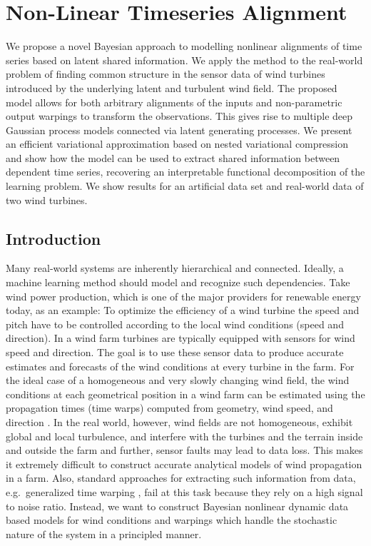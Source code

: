 \chapter{Non-Linear Timeseries Alignment}
\label{toc:alignment}
We propose a novel Bayesian approach to modelling nonlinear alignments of time series based on latent shared information.
We apply the method to the real-world problem of finding common structure in the sensor data of wind turbines introduced by the underlying latent and turbulent wind field.
The proposed model allows for both arbitrary alignments of the inputs and non-parametric output warpings to transform the observations.
This gives rise to multiple deep Gaussian process models connected via latent generating processes.
We present an efficient variational approximation based on nested variational compression and show how the model can be used to extract shared information between dependent time series, recovering an interpretable functional decomposition of the learning problem.
We show results for an artificial data set and real-world data of two wind turbines.


\section{Introduction}
Many real-world systems are inherently hierarchical and connected.
Ideally, a machine learning method should model and recognize such dependencies.
Take wind power production, which is one of the major providers for renewable energy today, as an example:
To optimize the efficiency of a wind turbine the speed and pitch have to be controlled according to the local wind conditions (speed and direction).
In a wind farm turbines are typically equipped with sensors for wind speed and direction.
The goal is to use these sensor data to produce accurate estimates and forecasts of the wind conditions at every turbine in the farm.
For the ideal case of a homogeneous and very slowly changing wind field, the wind conditions at each geometrical position in a wind farm can be estimated using the propagation times (time warps) computed from geometry, wind speed, and direction \parencite{soleimanzadeh_controller_2011,bitar_coordinated_2013,schepers_improved_2007}.
In the real world, however, wind fields are not homogeneous, exhibit global and local turbulence, and interfere with the turbines and the terrain inside and outside the farm and further, sensor faults may lead to data loss.
This makes it extremely difficult to construct accurate analytical models of wind propagation in a farm.
Also, standard approaches for extracting such information from data, e.g.\ generalized time warping  \parencite{zhou_generalized_2012}, fail at this task because they rely on a high signal to noise ratio.
Instead, we want to construct Bayesian nonlinear dynamic data based models for wind conditions and warpings which handle the stochastic nature of the system in a principled manner.

